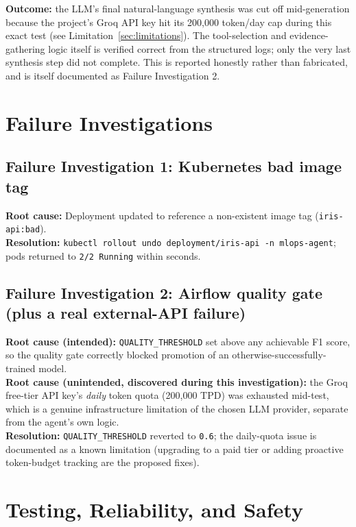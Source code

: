 \documentclass[11pt,a4paper]{article}
\begin{document}
\textbf{Outcome:} the LLM's final natural-language synthesis was cut off
mid-generation because the project's Groq API key hit its 200{,}000
token/day cap during this exact test (see Limitation~\ref{sec:limitations}).
The tool-selection and evidence-gathering logic itself is verified correct
from the structured logs; only the very last synthesis step did not
complete. This is reported honestly rather than fabricated, and is itself
documented as Failure Investigation 2.

\section{Failure Investigations}
\label{sec:failures}

\subsection{Failure Investigation 1: Kubernetes bad image tag}
\textbf{Root cause:} Deployment updated to reference a non-existent image
tag (\texttt{iris-api:bad}).\\
\textbf{Resolution:} \texttt{kubectl rollout undo deployment/iris-api -n
mlops-agent}; pods returned to \texttt{2/2 Running} within seconds.

\subsection{Failure Investigation 2: Airflow quality gate (plus a real external-API failure)}
\textbf{Root cause (intended):} \texttt{QUALITY\_THRESHOLD} set above any
achievable F1 score, so the quality gate correctly blocked promotion of an
otherwise-successfully-trained model.\\
\textbf{Root cause (unintended, discovered during this investigation):} the
Groq free-tier API key's \emph{daily} token quota (200{,}000 TPD) was
exhausted mid-test, which is a genuine infrastructure limitation of the
chosen LLM provider, separate from the agent's own logic.\\
\textbf{Resolution:} \texttt{QUALITY\_THRESHOLD} reverted to \texttt{0.6};
the daily-quota issue is documented as a known limitation (upgrading to a
paid tier or adding proactive token-budget tracking are the proposed fixes).

\section{Testing, Reliability, and Safety}
\end{document}
